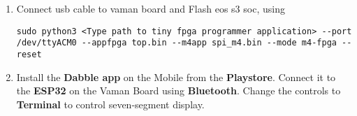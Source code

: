 \begin{enumerate}[label=\thesection.\arabic*.,ref=\thesection.\theenumi]
\item Connect usb cable to vaman board and Flash eos s3 soc, using
\begin{lstlisting}
sudo python3 <Type path to tiny fpga programmer application> --port /dev/ttyACM0 --appfpga top.bin --m4app spi_m4.bin --mode m4-fpga --reset
\end{lstlisting} 

\item Install the \textbf{Dabble app} on the Mobile from the \textbf{Playstore}.
Connect it to the \textbf{ESP32} on the Vaman Board using \textbf{Bluetooth}. 
Change the controls to \textbf{Terminal} to control seven-segment display.
\end{enumerate}